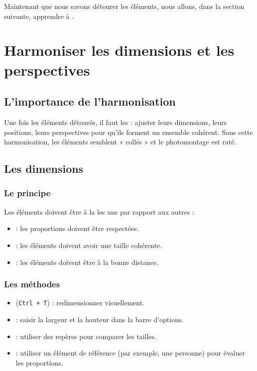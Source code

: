 Maintenant que nous savons détourer les éléments, nous allons, dans la section suivante, apprendre à .

\section{Harmoniser les dimensions et les perspectives}

\subsection{L'importance de l'harmonisation}

Une fois les éléments détourés, il faut les  : ajuster leurs dimensions, leurs positions, leurs perspectives pour qu'ils forment un ensemble cohérent. Sans cette harmonisation, les éléments semblent « collés » et le photomontage est raté.

\subsection{Les dimensions}

\subsubsection{Le principe}

Les éléments doivent être à la  les uns par rapport aux autres :

\begin{itemize}
    \item {} : les proportions doivent être respectées.
    \item {} : les éléments doivent avoir une taille cohérente.
    \item {} : les éléments doivent être à la bonne distance.
\end{itemize}

\subsubsection{Les méthodes}

\begin{itemize}
    \item {} (\texttt{Ctrl + T}) : redimensionner visuellement.
    \item {} : saisir la largeur et la hauteur dans la barre d'options.
    \item {} : utiliser des repères pour comparer les tailles.
    \item {} : utiliser un élément de référence (par exemple, une personne) pour évaluer les proportions.
\end{itemize}

